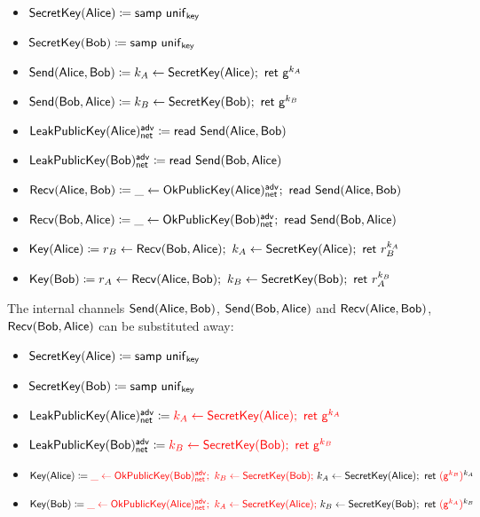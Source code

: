 \begin{itemize}
\item $\mathsf{SecretKey}(\mathsf{Alice}) \coloneqq \mathsf{samp} \ \mathsf{unif}_{\mathsf{key}}$
\item $\mathsf{SecretKey}(\mathsf{Bob}) \coloneqq \mathsf{samp} \ \mathsf{unif}_{\mathsf{key}}$
\item $\mathsf{Send}(\mathsf{Alice},\mathsf{Bob}) \coloneqq k_A \leftarrow \mathsf{SecretKey}(\mathsf{Alice}); \ \mathsf{ret} \ \mathsf{g}^{k_A}$
\item $\mathsf{Send}(\mathsf{Bob},\mathsf{Alice}) \coloneqq k_B \leftarrow \mathsf{SecretKey}(\mathsf{Bob}); \ \mathsf{ret} \ \mathsf{g}^{k_B}$
\item $\mathsf{LeakPublicKey}(\mathsf{Alice})^{\mathsf{adv}}_{\mathsf{net}} \coloneqq \mathsf{read} \ \mathsf{Send}(\mathsf{Alice},\mathsf{Bob})$
\item $\mathsf{LeakPublicKey}(\mathsf{Bob})^{\mathsf{adv}}_{\mathsf{net}} \coloneqq \mathsf{read} \ \mathsf{Send}(\mathsf{Bob},\mathsf{Alice})$
\item $\Recv(\Alice,\Bob) \coloneqq \_ \leftarrow \OkPublicKey(\Alice)^\adv_\net; \ \read{\Send(\Alice,\Bob)}$
\item $\Recv(\Bob,\Alice) \coloneqq \_ \leftarrow \OkPublicKey(\Bob)^\adv_\net; \ \read{\Send(\Bob,\Alice)}$
\item $\Key(\Alice) \coloneqq r_B \leftarrow \Recv(\Bob,\Alice); \ k_A \leftarrow \SecretKey(\Alice); \ \ret{r_B^{k_A}}$
\item $\Key(\Bob) \coloneqq r_A \leftarrow \Recv(\Alice,\Bob); \ k_B \leftarrow \SecretKey(\Bob); \ \ret{r_A^{k_B}}$
\end{itemize}

\noindent The internal channels $\mathsf{Send}(\mathsf{Alice},\mathsf{Bob})$, $\mathsf{Send}(\mathsf{Bob},\mathsf{Alice})$ and $\mathsf{Recv}(\mathsf{Alice},\mathsf{Bob})$, $\mathsf{Recv}(\mathsf{Bob},\mathsf{Alice})$ can be substituted away:

\begin{itemize}
\item $\mathsf{SecretKey}(\mathsf{Alice}) \coloneqq \mathsf{samp} \ \mathsf{unif}_{\mathsf{key}}$
\item $\mathsf{SecretKey}(\mathsf{Bob}) \coloneqq \mathsf{samp} \ \mathsf{unif}_{\mathsf{key}}$
\item $\LeakPublicKey(\Alice)^\adv_\net \coloneqq {\color{red} k_A \leftarrow \SecretKey(\Alice); \ \ret{\gen^{k_A}}}$
\item $\LeakPublicKey(\Bob)^\adv_\net \coloneqq {\color{red} k_B \leftarrow \SecretKey(\Bob); \ \ret{\gen^{k_B}}}$
\item $\Key(\Alice) \coloneqq {\color{red} \_ \leftarrow \OkPublicKey(\Bob)^\adv_\net; \ k_B \leftarrow \SecretKey(\Bob); \ } k_A \leftarrow \SecretKey(\Alice); \ \ret{{\color{red} (\gen^{k_B})}^{k_A}}$
\item $\Key(\Bob) \coloneqq {\color{red} \_ \leftarrow \OkPublicKey(\Alice)^\adv_\net; \ k_A \leftarrow \SecretKey(\Alice); \ } k_B \leftarrow \SecretKey(\Bob); \ \ret{{\color{red} (\gen^{k_A})}^{k_B}}$
\end{itemize}

